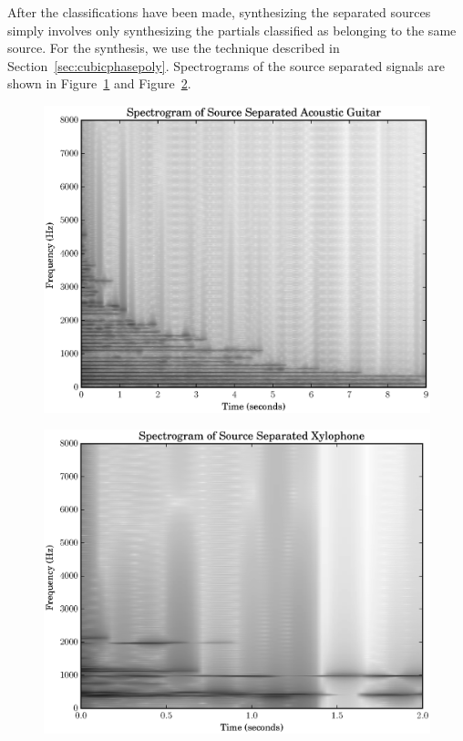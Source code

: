 After the classifications have been made, synthesizing the separated sources
simply involves only synthesizing the partials classified as belonging to the
same source. For the synthesis, we use the technique described in
Section~\ref{sec:cubicphasepoly}. Spectrograms of the source separated signals
are shown in Figure~\ref{plot:acgtra3specgramss} and
Figure~\ref{plot:xylofs4specgramss}. 

\begin{figure}[!t]
    \centering
    \includegraphics[width=\figwidthscale\textwidth]{plots/ac_gtr_ss_spec.eps}
    \caption{\label{plot:acgtra3specgramss}}
\end{figure}

\begin{figure}[!t]
    \centering
    \includegraphics[width=\figwidthscale\textwidth]{plots/xylo_ss_spec.eps}
    \caption{\label{plot:xylofs4specgramss}}
\end{figure}

